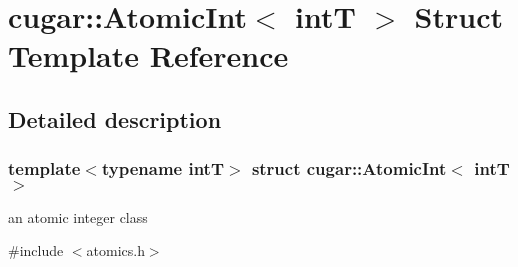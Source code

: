 \hypertarget{structcugar_1_1_atomic_int}{}\section{cugar\+:\+:Atomic\+Int$<$ intT $>$ Struct Template Reference}
\label{structcugar_1_1_atomic_int}


\subsection{Detailed description}
\subsubsection*{template$<$typename intT$>$\newline
struct cugar\+::\+Atomic\+Int$<$ int\+T $>$}

an atomic integer class 

{\ttfamily \#include $<$atomics.\+h$>$}

